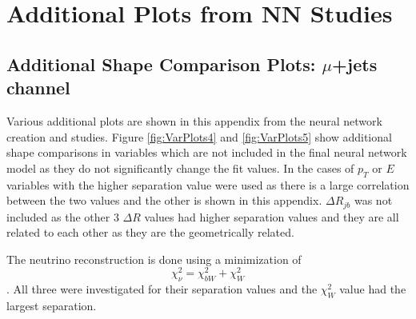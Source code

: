 \chapter{Additional Plots from NN Studies}

\section{Additional Shape Comparison Plots: $\mu$+jets channel}
Various additional plots are shown in this appendix from the neural network creation and studies.  Figure \ref{fig:VarPlots4} and \ref{fig:VarPlots5} show additional shape comparisons in variables which are not included in the final neural network model as they do not significantly change the fit values.  In the cases of $p_T$ or $E$ variables with the higher separation value were used as there is a large correlation between the two values and the other is shown in this appendix.  $\Delta R_{jb}$ was not included as the other 3 $\Delta R$ values had higher separation values and they are all related to each other as they are the geometrically related. 

The neutrino reconstruction is done using a minimization of \[ \chi^2_{\nu} = \chi^2_{bW} + \chi^2_{W} \].  All three were investigated for their separation values and the $\chi^2_{W}$ value had the largest separation.

